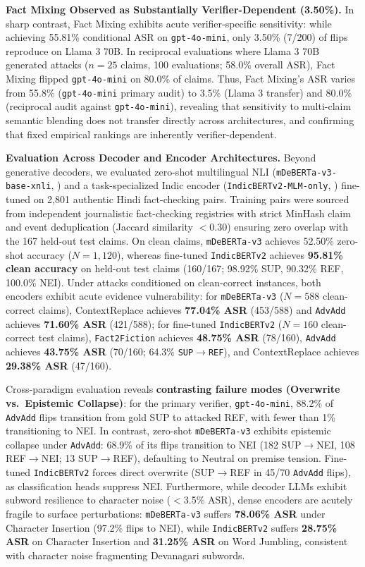 \documentclass[11pt]{article}
\begin{document}
\textbf{Fact Mixing Observed as Substantially Verifier-Dependent (3.50\%).} In sharp contrast, Fact Mixing exhibits acute verifier-specific sensitivity: while achieving 55.81\% conditional ASR on \texttt{gpt-4o-mini}, only 3.50\% (7/200) of flips reproduce on Llama 3 70B. In reciprocal evaluations where Llama 3 70B generated attacks ($n=25$ claims, 100 evaluations; 58.0\% overall ASR), Fact Mixing flipped \texttt{gpt-4o-mini} on 80.0\% of claims. Thus, Fact Mixing's ASR varies from 55.8\% (\texttt{gpt-4o-mini} primary audit) to 3.5\% (Llama 3 transfer) and 80.0\% (reciprocal audit against \texttt{gpt-4o-mini}), revealing that sensitivity to multi-claim semantic blending does not transfer directly across architectures, and confirming that fixed empirical rankings are inherently verifier-dependent.

\textbf{Evaluation Across Decoder and Encoder Architectures.} Beyond generative decoders, we evaluated zero-shot multilingual NLI (\texttt{mDeBERTa-v3-base-xnli}, \citealt{laurer2023building}) and a task-specialized Indic encoder (\texttt{IndicBERTv2-MLM-only}, \citealt{doddapaneni2023indic}) fine-tuned on 2,801 authentic Hindi fact-checking pairs. Training pairs were sourced from independent journalistic fact-checking registries with strict MinHash claim and event deduplication (Jaccard similarity $< 0.30$) ensuring zero overlap with the 167 held-out test claims. On clean claims, \texttt{mDeBERTa-v3} achieves 52.50\% zero-shot accuracy ($N=1,120$), whereas fine-tuned \texttt{IndicBERTv2} achieves \textbf{95.81\% clean accuracy} on held-out test claims (160/167; 98.92\% SUP, 90.32\% REF, 100.0\% NEI). Under attacks conditioned on clean-correct instances, both encoders exhibit acute evidence vulnerability: for \texttt{mDeBERTa-v3} ($N=588$ clean-correct claims), ContextReplace achieves \textbf{77.04\% ASR} (453/588) and \texttt{AdvAdd} achieves \textbf{71.60\% ASR} (421/588); for fine-tuned \texttt{IndicBERTv2} ($N=160$ clean-correct test claims), \texttt{Fact2Fiction} achieves \textbf{48.75\% ASR} (78/160), \texttt{AdvAdd} achieves \textbf{43.75\% ASR} (70/160; 64.3\% \texttt{SUP}$\to$\texttt{REF}), and ContextReplace achieves \textbf{29.38\% ASR} (47/160).

Cross-paradigm evaluation reveals \textbf{contrasting failure modes (Overwrite vs.\ Epistemic Collapse)}: for the primary verifier, \texttt{gpt-4o-mini}, 88.2\% of \texttt{AdvAdd} flips transition from gold SUP to attacked REF, with fewer than 1\% transitioning to NEI. In contrast, zero-shot \texttt{mDeBERTa-v3} exhibits epistemic collapse under \texttt{AdvAdd}: 68.9\% of its flips transition to NEI (182 SUP$\to$NEI, 108 REF$\to$NEI; 13 SUP$\to$REF), defaulting to Neutral on premise tension. Fine-tuned \texttt{IndicBERTv2} forces direct overwrite (SUP$\to$REF in 45/70 \texttt{AdvAdd} flips), as classification heads suppress NEI. Furthermore, while decoder LLMs exhibit subword resilience to character noise ($<$3.5\% ASR), dense encoders are acutely fragile to surface perturbations: \texttt{mDeBERTa-v3} suffers \textbf{78.06\% ASR} under Character Insertion (97.2\% flips to NEI), while \texttt{IndicBERTv2} suffers \textbf{28.75\% ASR} on Character Insertion and \textbf{31.25\% ASR} on Word Jumbling, consistent with character noise fragmenting Devanagari subwords.
\end{document}
